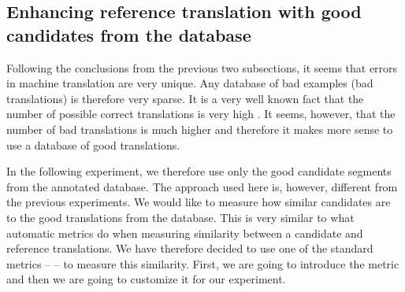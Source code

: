 \subsection{Enhancing reference translation with good candidates from the database}
\label{enhancing:bleu}

Following the conclusions from the previous two subsections, it seems that
errors in machine translation are very unique. Any database of bad examples
(bad translations) is therefore very sparse. It is a very well known fact that the
number of possible correct translations is very high . It
seems, however, that the number of bad translations is much higher and
therefore it makes more sense to use a database of good translations. 

In the following experiment, we therefore use only the good candidate segments
from the annotated database. The approach used here is, however, different from
the previous experiments. We would like to measure how similar candidates are
to the good translations from the database. This is very similar to what
automatic metrics do when measuring similarity between a candidate and
reference translations. We have therefore decided to use one of the standard
metrics --  -- to measure this similarity. First, we are going to
introduce the metric and then we are going to customize it for our experiment. 

